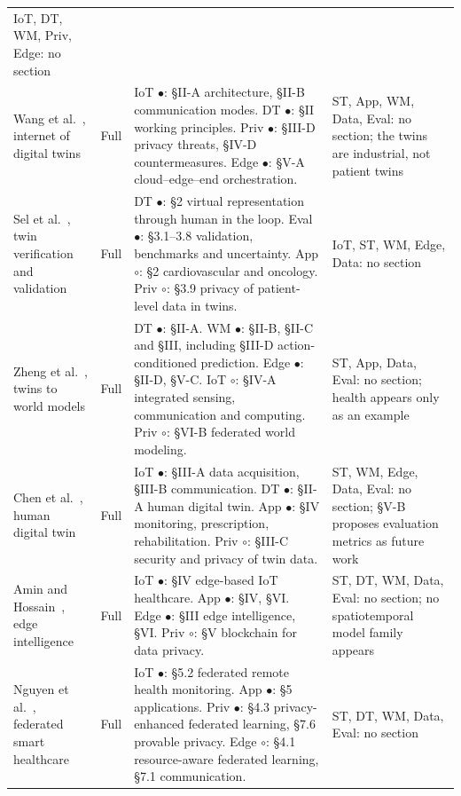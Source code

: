 \documentclass[journal]{IEEEtran}
\begin{document}
\begin{table}[tbp]
\begin{tabularx}{\textwidth}{L{2.45cm} L{1.15cm} X L{2.5cm}}
IoT, DT, WM, Priv, Edge: no section \\
\addlinespace[2pt]
Wang et al.~\cite{Wang2023Survey}, internet of digital twins &
Full &
IoT $\bullet$: \S II-A architecture, \S II-B communication modes. DT $\bullet$: \S II working principles. Priv $\bullet$: \S III-D privacy threats, \S IV-D countermeasures. Edge $\bullet$: \S V-A cloud--edge--end orchestration. &
ST, App, WM, Data, Eval: no section; the twins are industrial, not patient twins \\
\addlinespace[2pt]
Sel et al.~\cite{Sel2025VVUQ}, twin verification and validation &
Full &
DT $\bullet$: \S 2 virtual representation through human in the loop. Eval $\bullet$: \S 3.1--3.8 validation, benchmarks and uncertainty. App $\circ$: \S 2 cardiovascular and oncology. Priv $\circ$: \S 3.9 privacy of patient-level data in twins. &
IoT, ST, WM, Edge, Data: no section \\
\addlinespace[2pt]
Zheng et al.~\cite{Zheng2026DTtoWM}, twins to world models &
Full &
DT $\bullet$: \S II-A. WM $\bullet$: \S II-B, \S II-C and \S III, including \S III-D action-conditioned prediction. Edge $\bullet$: \S II-D, \S V-C. IoT $\circ$: \S IV-A integrated sensing, communication and computing. Priv $\circ$: \S VI-B federated world modeling. &
ST, App, Data, Eval: no section; health appears only as an example \\
\addlinespace[2pt]
Chen et al.~\cite{chen2024genaitwin}, human digital twin &
Full &
IoT $\bullet$: \S III-A data acquisition, \S III-B communication. DT $\bullet$: \S II-A human digital twin. App $\bullet$: \S IV monitoring, prescription, rehabilitation. Priv $\circ$: \S III-C security and privacy of twin data. &
ST, WM, Edge, Data, Eval: no section; \S V-B proposes evaluation metrics as future work \\
\addlinespace[2pt]
Amin and Hossain~\cite{amin2021edgeintel}, edge intelligence &
Full &
IoT $\bullet$: \S IV edge-based IoT healthcare. App $\bullet$: \S IV, \S VI. Edge $\bullet$: \S III edge intelligence, \S VI. Priv $\circ$: \S V blockchain for data privacy. &
ST, DT, WM, Data, Eval: no section; no spatiotemporal model family appears \\
\addlinespace[2pt]
Nguyen et al.~\cite{nguyen2022FLsmarthealthcare}, federated smart healthcare &
Full &
IoT $\bullet$: \S 5.2 federated remote health monitoring. App $\bullet$: \S 5 applications. Priv $\bullet$: \S 4.3 privacy-enhanced federated learning, \S 7.6 provable privacy. Edge $\circ$: \S 4.1 resource-aware federated learning, \S 7.1 communication. &
ST, DT, WM, Data, Eval: no section \\

\end{tabularx}
\end{table}
\end{document}
